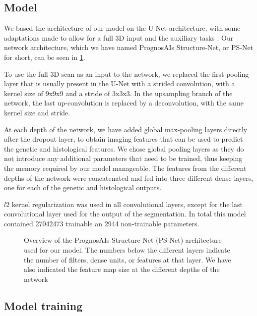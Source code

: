 \subsection{Model}\label{sec:model}

We based the architecture of our model on the U-Net architecture, with some adaptations made to allow for a full 3D input and the auxiliary tasks \autocite{ronneberger2015unet}.
Our network architecture, which we have named PrognosAIs Structure-Net, or PS-Net for short, can be seen in \cref{fig:psnet_architecture}.

To use the full 3D scan as an input to the network, we replaced the first pooling layer that is usually present in the U-Net with a strided convolution, with a kernel size of 9x9x9 and a stride of 3x3x3.
In the upsampling branch of the network, the last up-convolution is replaced by a deconvolution, with the same kernel size and stride.

At each depth of the network, we have added global max-pooling layers directly after the dropout layer, to obtain imaging features that can be used to predict the genetic and histological features.
We chose global pooling layers as they do not introduce any additional parameters that need to be trained, thus keeping the memory required by our model manageable.
The features from the different depths of the network were concatenated and fed into three different dense layers, one for each of the genetic and histological outputs.

$l2$ kernel regularization was used in all convolutional layers, except for the last convolutional layer used for the output of the segmentation.
In total this model contained \num{27042473} trainable an \num{2944} non-trainable parameters.

\begin{figure}
\caption{Overview of the PrognosAIs Structure-Net (PS-Net) architecture used for our model. The numbers below the different layers indicate the number of filters, dense units, or features at that layer.
We have also indicated the feature map size at the different depths of the network}\label{fig:psnet_architecture}
\end{figure}

\subsection{Model training}

